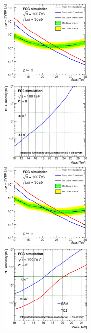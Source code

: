 \documentclass{cernrep}
\begin{document}
\begin{figure}[!htb]
\begin{figure}[!htb]
\includegraphics[width=0.495\textwidth]{Fig/Zptt/lim_Zprime_tt_fcc_v02_tagger.eps}
\includegraphics[width=0.495\textwidth]{Fig/Zptt/DiscoveryPotential_tt_TC2_tagger_rootStyle.eps}
\includegraphics[width=0.495\textwidth]{Fig/Zptt/lim_Zprime_tt_fcc_v02_tagger_TRFbtag.eps}
\includegraphics[width=0.495\textwidth]{Fig/Zptt/DiscoveryPotential_tt_SSM_TC2_tagger_TRFbtag_rootStyle.eps}

\end{figure}
\end{figure}
\end{document}
